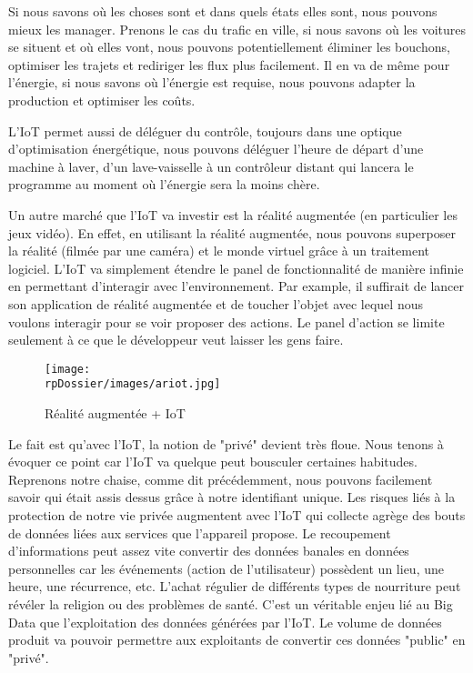 
Si nous savons où les choses sont et dans quels états elles sont, nous pouvons mieux les manager. Prenons le cas du trafic en ville, si nous savons où les voitures se situent et où elles vont, nous pouvons potentiellement éliminer les bouchons, optimiser les trajets et rediriger les flux plus facilement. Il en va de même pour l'énergie, si nous savons où l'énergie est requise, nous pouvons adapter la production et optimiser les coûts.


L'IoT permet aussi de déléguer du contrôle, toujours dans une optique d'optimisation énergétique, nous pouvons déléguer l'heure de départ d'une machine à laver, d'un lave-vaisselle à un contrôleur distant qui lancera le programme au moment où l'énergie sera la moins chère.


Un autre marché que l'IoT va investir est la réalité augmentée (en particulier les jeux vidéo). En effet, en utilisant la réalité augmentée, nous pouvons superposer la réalité (filmée par une caméra) et le monde virtuel grâce à un traitement logiciel. L'IoT va simplement étendre le panel de fonctionnalité de manière infinie en permettant d'interagir avec l'environnement. Par example, il suffirait de lancer son application de réalité augmentée et de toucher l'objet avec lequel nous voulons interagir pour se voir proposer des actions. Le panel d'action se limite seulement à ce que le développeur veut laisser les gens faire.

\begin{figure}[H]
\begin{center}
\texttt{[image: \\rpDossier/images/ariot.jpg]}
\end{center}
\caption{Réalité augmentée + IoT}
\label{conflinphone}
\end{figure}


Le fait est qu'avec l'IoT, la notion de "privé" devient très floue. Nous tenons à évoquer ce point car l'IoT va quelque peut bousculer certaines habitudes. Reprenons notre chaise, comme dit précédemment, nous pouvons facilement savoir qui était assis dessus grâce à notre identifiant unique. Les risques liés à la protection de notre vie privée augmentent avec l'IoT qui collecte agrège des bouts de données liées aux services que l'appareil propose. Le recoupement d'informations peut assez vite convertir des données banales en données personnelles car les événements (action de l'utilisateur) possèdent un lieu, une heure, une récurrence, etc. L'achat régulier de différents types de nourriture peut révéler la religion ou des problèmes de santé. C'est un véritable enjeu lié au Big Data que l'exploitation des données générées par l'IoT. Le volume de données produit va pouvoir permettre aux exploitants de convertir ces données "public" en "privé".

